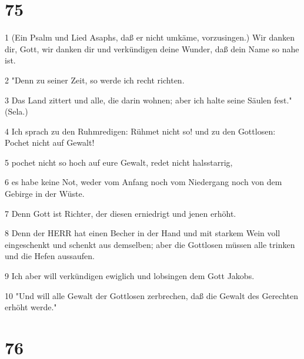 \chapter{75}

\par 1 (Ein Psalm und Lied Asaphs, daß er nicht umkäme, vorzusingen.) Wir danken dir, Gott, wir danken dir und verkündigen deine Wunder, daß dein Name so nahe ist.
\par 2 "Denn zu seiner Zeit, so werde ich recht richten.
\par 3 Das Land zittert und alle, die darin wohnen; aber ich halte seine Säulen fest." (Sela.)
\par 4 Ich sprach zu den Ruhmredigen: Rühmet nicht so! und zu den Gottlosen: Pochet nicht auf Gewalt!
\par 5 pochet nicht so hoch auf eure Gewalt, redet nicht halsstarrig,
\par 6 es habe keine Not, weder vom Anfang noch vom Niedergang noch von dem Gebirge in der Wüste.
\par 7 Denn Gott ist Richter, der diesen erniedrigt und jenen erhöht.
\par 8 Denn der HERR hat einen Becher in der Hand und mit starkem Wein voll eingeschenkt und schenkt aus demselben; aber die Gottlosen müssen alle trinken und die Hefen aussaufen.
\par 9 Ich aber will verkündigen ewiglich und lobsingen dem Gott Jakobs.
\par 10 "Und will alle Gewalt der Gottlosen zerbrechen, daß die Gewalt des Gerechten erhöht werde."

\chapter{76}

